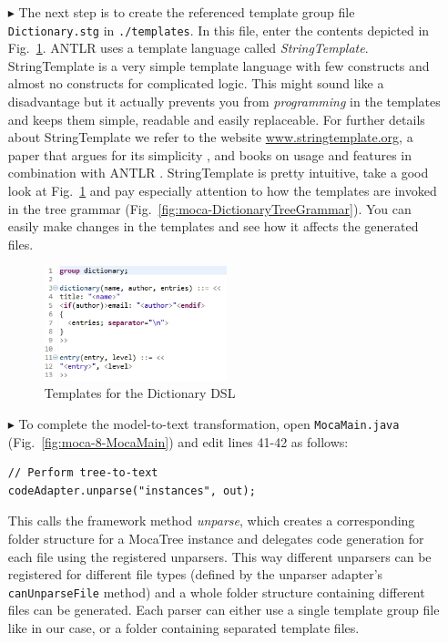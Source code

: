 \begin{enumerate}
\item[$\blacktriangleright$] The next step is to create the referenced template group file \texttt{Dic\-tion\-ary.stg} in \texttt{./templates}.
In this file, enter the contents depicted in Fig.~\ref{fig:moca-DictionaryTemplates}.    
ANTLR uses a template language called \emph{StringTemplate}.
StringTemplate is a very simple template language with few constructs and almost no constructs for complicated logic.
This might sound like a disadvantage but it actually prevents you from \emph{programming} in the templates and keeps them simple, readable and easily replaceable.
For further details about StringTemplate we refer to the website \url{www.stringtemplate.org}, a paper that argues for its simplicity \cite{PAR04}, and books on usage and features in combination with ANTLR \cite{ANTLR, LangImplPatterns}.
StringTemplate is pretty intuitive, take a good look at Fig.~\ref{fig:moca-DictionaryTemplates} and pay especially attention to how the templates are invoked in the tree grammar (Fig.~\ref{fig:moca-DictionaryTreeGrammar}).
You can easily make changes in the templates and see how it affects the generated files.
\begin{figure}[!htbp]
\begin{center}
 \includegraphics[width=0.5\textwidth]{pics/moca/5MocaTreeToText/DictionaryTemplates}
  \caption{Templates for the Dictionary DSL} 
  \label{fig:moca-DictionaryTemplates}
\end{center}
\end{figure} 

\item[$\blacktriangleright$] To complete the model-to-text transformation, open \texttt{MocaMain.java} (Fig.~\ref{fig:moca-8-MocaMain}) and edit lines 41-42 as follows:
\begin{verbatim}
// Perform tree-to-text
codeAdapter.unparse("instances", out);
\end{verbatim}
This calls the framework method \emph{unparse}, which creates a corresponding folder structure for a MocaTree instance and delegates code generation for each file using the registered unparsers.
This way different unparsers can be registered for different file types (defined by the unparser adapter's \texttt{canUnparseFile} method) and a whole folder structure containing different files can be generated.
Each parser can either use a single template group file like in our case, or a folder containing separated template files.


\end{enumerate}
